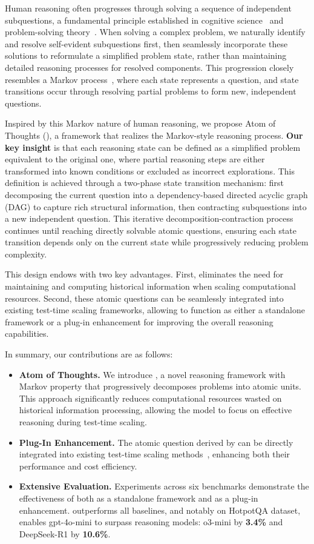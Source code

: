 Human reasoning often progresses through solving a sequence of independent subquestions, a fundamental principle established in cognitive science~\cite{simon1962architecture} and problem-solving theory~\cite{polya1945solve}. When solving a complex problem, we naturally identify and resolve self-evident subquestions first, then seamlessly incorporate these solutions to reformulate a simplified problem state, rather than maintaining detailed reasoning processes for resolved components. This progression closely resembles a Markov process~\cite{markov1906extension}, where each state represents a question, and state transitions occur through resolving partial problems to form new, independent questions. 


Inspired by this Markov nature of human reasoning, we propose Atom of Thoughts (\our), a framework that realizes the Markov-style reasoning process. \textbf{Our key insight} is that each reasoning state can be defined as a simplified problem equivalent to the original one, where partial reasoning steps are either transformed into known conditions or excluded as incorrect explorations. This definition is achieved through a two-phase state transition mechanism: first decomposing the current question into a dependency-based directed acyclic graph (DAG) to capture rich structural information, then contracting subquestions into a new independent question. This iterative decomposition-contraction process continues until reaching directly solvable atomic questions, ensuring each state transition depends only on the current state while progressively reducing problem complexity.


This design endows \our with two key advantages. First, \our eliminates the need for maintaining and computing historical information when scaling computational resources. Second, these atomic questions can be seamlessly integrated into existing test-time scaling frameworks, allowing \our to function as either a standalone framework or a plug-in enhancement for improving the overall reasoning capabilities.

In summary, our contributions are as follows:
\begin{itemize}
    \item \textbf{Atom of Thoughts.} We introduce \our, a novel reasoning framework with Markov property that progressively decomposes problems into atomic units. This approach significantly reduces computational resources wasted on historical information processing, allowing the model to focus on effective reasoning during test-time scaling.
    \item \textbf{Plug-In Enhancement.} The atomic question derived by \our can be directly integrated into existing test-time scaling methods~\cite{Bi2024fot, Wang2023cotsc}, enhancing both their performance and cost efficiency.
    \item \textbf{Extensive Evaluation.} Experiments across six benchmarks demonstrate the effectiveness of \our both as a standalone framework and as a plug-in enhancement. \our outperforms all baselines, and notably on HotpotQA dataset, enables gpt-4o-mini to surpass reasoning models: o3-mini by \textbf{3.4\%} and DeepSeek-R1 by \textbf{10.6\%}.
\end{itemize}

 